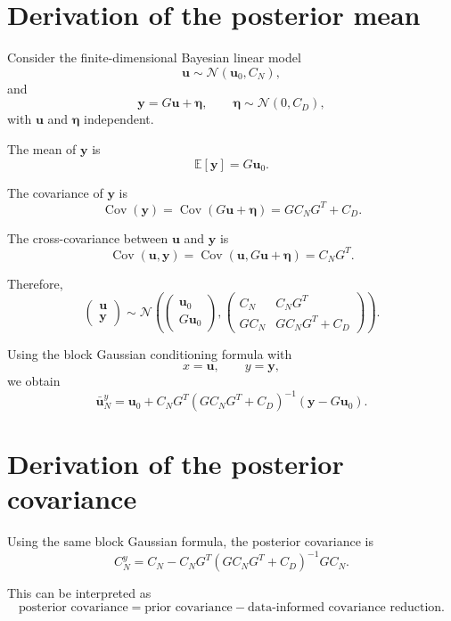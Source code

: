 \documentclass[11pt,a4paper]{book}
\begin{document}
\section{Derivation of the posterior mean}

Consider the finite-dimensional Bayesian linear model
\[
    \bm{u}\sim\mathcal{N}(\bm{u}_0,C_N),
\]
and
\[
    \bm{y}=G\bm{u}+\bm{\eta},
    \qquad
    \bm{\eta}\sim\mathcal{N}(0,C_D),
\]
with $\bm{u}$ and $\bm{\eta}$ independent.

The mean of $\bm{y}$ is
\[
    \mathbb{E}[\bm{y}]
    =
    G\bm{u}_0.
\]

The covariance of $\bm{y}$ is
\[
    \operatorname{Cov}(\bm{y})
    =
    \operatorname{Cov}(G\bm{u}+\bm{\eta})
    =
    GC_NG^T+C_D.
\]

The cross-covariance between $\bm{u}$ and $\bm{y}$ is
\[
    \operatorname{Cov}(\bm{u},\bm{y})
    =
    \operatorname{Cov}(\bm{u},G\bm{u}+\bm{\eta})
    =
    C_NG^T.
\]

Therefore,
\[
    \begin{pmatrix}
        \bm{u}\\
        \bm{y}
    \end{pmatrix}
    \sim
    \mathcal{N}
    \left(
    \begin{pmatrix}
        \bm{u}_0\\
        G\bm{u}_0
    \end{pmatrix},
    \begin{pmatrix}
        C_N & C_NG^T\\
        GC_N & GC_NG^T+C_D
    \end{pmatrix}
    \right).
\]

Using the block Gaussian conditioning formula with
\[
    x=\bm{u},
    \qquad
    y=\bm{y},
\]
we obtain
\[
    \bar{\bm{u}}_N^y
    =
    \bm{u}_0
    +
    C_NG^T
    \left(
        GC_NG^T+C_D
    \right)^{-1}
    (\bm{y}-G\bm{u}_0).
\]

\section{Derivation of the posterior covariance}

Using the same block Gaussian formula, the posterior covariance is
\[
    C_N^y
    =
    C_N
    -
    C_NG^T
    \left(
        GC_NG^T+C_D
    \right)^{-1}
    GC_N.
\]

This can be interpreted as
\[
    \text{posterior covariance}
    =
    \text{prior covariance}
    -
    \text{data-informed covariance reduction}.
\]
\end{document}
